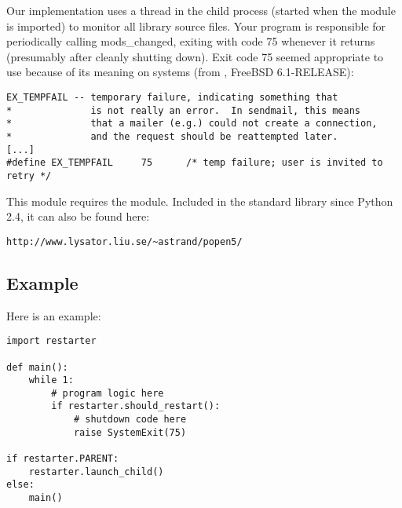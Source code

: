 Our implementation uses a thread in the child process (started when the module
is imported) to monitor all library source files. Your program is responsible
for periodically calling mods_changed, exiting with code 75 whenever it returns
 (presumably after cleanly shutting down). Exit code 75 seemed
appropriate to use because of its meaning on \UNIX{} systems (from
, FreeBSD 6.1-RELEASE):

\begin{verbatim}
EX_TEMPFAIL -- temporary failure, indicating something that
*              is not really an error.  In sendmail, this means
*              that a mailer (e.g.) could not create a connection,
*              and the request should be reattempted later.
[...]
#define EX_TEMPFAIL     75      /* temp failure; user is invited to retry */
\end{verbatim}

This module requires the  module. Included in the standard
library since Python 2.4, it can also be found here:

\begin{verbatim}
http://www.lysator.liu.se/~astrand/popen5/
\end{verbatim}


\subsection{Example \label{example}}

Here is an example:

\begin{verbatim}
import restarter

def main():
    while 1:
        # program logic here
        if restarter.should_restart():
            # shutdown code here
            raise SystemExit(75)

if restarter.PARENT:
    restarter.launch_child()
else:
    main()
\end{verbatim}